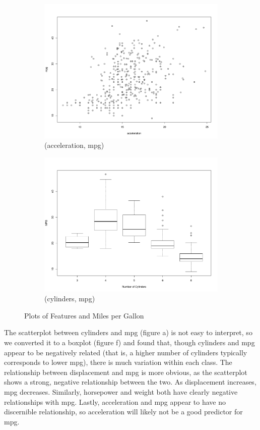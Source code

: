 \documentclass{homework}
\begin{document}
\begin{figure}
\begin{subfigure}[b]{0.3\textwidth}
        \includegraphics[width=\textwidth]{graphs/scatterAccel.pdf}
        \caption{(acceleration, mpg)}
        \label{fig:HP}
    \end{subfigure}
    \begin{subfigure}[b]{0.3\textwidth}
        \includegraphics[width=\textwidth]{graphs/boxCyl.pdf}
        \caption{(cylinders, mpg)}
        \label{fig:HP}
    \end{subfigure}
\caption{Plots of Features and Miles per Gallon}
\end{figure}

\question
The scatterplot between cylinders and mpg (figure a) is not easy to interpret, so we converted it to a boxplot (figure f) and found that, though cylinders and mpg appear to be negatively related (that is, a higher number of cylinders typically corresponds to lower mpg), there is much variation within each class. The relationship between displacement and mpg is more obvious, as the scatterplot shows a strong, negative relationship between the two. As displacement increases, mpg decreases. Similarly, horsepower and weight both have clearly negative relationships with mpg. Lastly, acceleration and mpg appear to have no discernible relationship, so acceleration will likely not be a good predictor for mpg.
\end{document}
